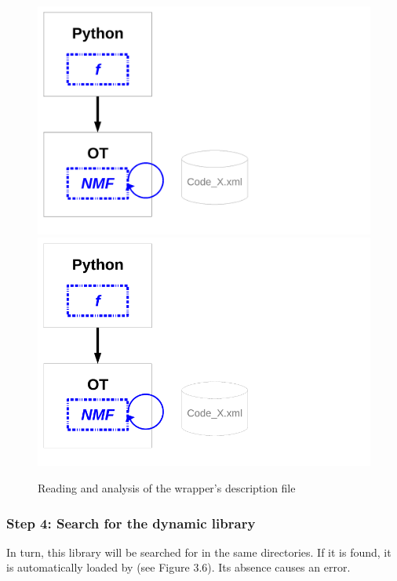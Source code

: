 \begin{figure}
  \begin{center}
    \ifpdf
    \includegraphics[width=12cm]{Figure5.pdf}
    \else
    \includegraphics[width=12cm]{Figure5.png}
    \fi
    \caption[Figure 5]{Reading and analysis of the wrapper's description file}
  \end{center}
\end{figure}

\subsubsection{Step 4: Search for the dynamic library}

In turn, this library will be searched for in the same directories. If it is found, it is automatically loaded by \OT (see Figure 3.6). Its absence causes an error.

